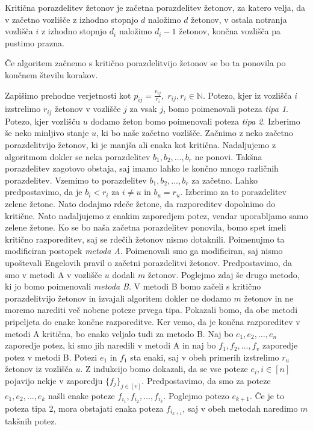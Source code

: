 \documentclass[twoside,11pt]{article}
\begin{document}
\begin{definicija}\label{kritična porazdelitev}
    Kritična porazdelitev žetonov je začetna porazdelitev žetonov, za katero velja, da v začetno vozlišče z izhodno stopnjo $d$ naložimo $d$ žetonov, v ostala notranja vozlišča $i$ z izhodno stopnjo $d_{i}$ naložimo $d_{i} - 1$ žetonov, končna vozlišča pa pustimo prazna.
\end{definicija}

\begin{trditev}\label{končnost}
    Če algoritem začnemo s kritično porazdelitvijo žetonov se bo ta ponovila po končnem številu korakov.
\end{trditev}

 Zapišimo prehodne verjetnosti kot $p_{ij} = \frac{r_{ij}}{r_{i}},\; r_{ij}, r_{i}\in \mathbb{N}$. Potezo, kjer iz vozlišča $i$ izstrelimo $r_{ij}$ žetonov v vozlišče $j$ za vsak $j$, bomo poimenovali poteza \emph{tipa 1}. Potezo, kjer vozlišču $u$ dodamo žeton bomo poimenovali poteza \emph{tipa 2}. Izberimo še neko minljivo stanje $u$, ki bo naše začetno vozlišče. Začnimo z neko začetno porazdelitvijo žetonov, ki je manjša ali enaka kot kritična. Nadaljujemo z algoritmom dokler se neka porazdelitev $b_{1},b_{2},\ldots,b_{r}$ ne ponovi. Takšna porazdelitev zagotovo obstaja, saj imamo lahko le končno mnogo različnih porazdelitev. Vzemimo to porazdelitev $b_{1},b_{2},\ldots,b_{r}$ za začetno. Lahko predpostavimo, da je $b_{i}<r_{i}$ za $i \neq u$ in $b_{u} = r_{u}$. Izberimo za to porazdelitev zelene žetone. Nato dodajmo rdeče žetone, da razporeditev dopolnimo do kritične. Nato nadaljujemo z enakim zaporedjem potez, vendar uporabljamo samo zelene žetone. Ko se bo naša začetna porazdelitev ponovila, bomo spet imeli kritično razporeditev, saj se rdečih žetonov nismo dotaknili. Poimenujmo ta modificiran postopek \emph{metoda A}. Poimenovali smo ga modificiran, saj nismo upoštevali Engelovih pravil o začetni porazdelitvi žetonov. 
Predpostavimo, da smo v metodi A v vozlišče $u$ dodali $m$ žetonov. Poglejmo zdaj še drugo metodo, ki jo bomo poimenovali \emph{metoda B}. V metodi B bomo začeli s kritično porazdelitvijo žetonov in izvajali algoritem dokler ne dodamo $m$ žetonov in ne moremo narediti več nobene poteze prvega tipa. Pokazali bomo, da obe metodi pripeljeta do enake končne razporeditve. Ker vemo, da je končna razporeditev v metodi A kritična, bo enako veljalo tudi za metodo B. \newline
\indent Naj bo $e_{1},e_{2},\ldots,e_{n}$ zaporedje potez, ki smo jih naredili v metodi A in naj bo $f_{1},f_{2},\ldots,f_{v}$ zaporedje potez v metodi B. Potezi $e_{1}$ in $f_{1}$ sta enaki, saj v obeh primerih izstrelimo $r_{u}$ žetonov iz vozlišča $u$. Z indukcijo bomo dokazali, da se vse poteze $e_{i}, i \in [n] $ pojavijo nekje v zaporedju $\{ f_{j}\} _{j\in [v] }$. Predpostavimo, da smo za poteze $e_{1},e_{2},\ldots,e_{k}$ našli enake poteze $f_{i_1},f_{i_2},\ldots,f_{i_k}$. Poglejmo potezo $e_{k+1}$. Če je to poteza tipa 2, mora obstajati enaka poteza $f_{i_{k+1}}$, saj v obeh metodah naredimo $m$ takšnih potez.
\end{document}
